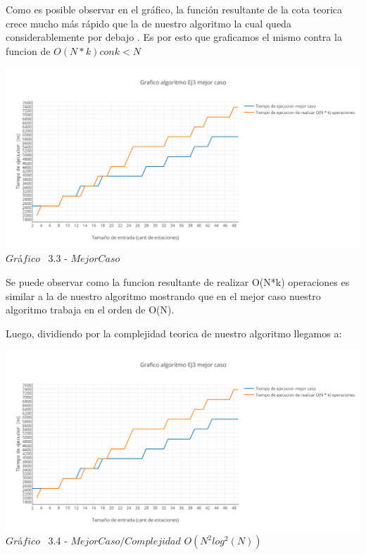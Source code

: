 Como es posible observar en el gr\'afico, la funci\'on resultante de la cota teorica crece mucho m\'as r\'apido que la de nuestro algoritmo la cual queda considerablemente por debajo . Es por esto que graficamos el mismo contra la funcion de $O(N*k) con k < N$

\vspace*{0.3cm} \vspace*{0.3cm}
  \begin{center}
 \includegraphics[scale=0.65]{./EJ3/mejorcaso1.png}
 {$Gr$\'a$fico$ \ 3.3 - $Mejor Caso$}
  \end{center}
  \vspace*{0.3cm}


Se puede observar como la funcion resultante de realizar O(N*k) operaciones es similar a la de nuestro algoritmo mostrando que en el mejor caso nuestro algoritmo trabaja en el orden de O(N).

Luego, dividiendo por la complejidad teorica de nuestro algoritmo llegamos a:\\

\vspace*{0.3cm} \vspace*{0.3cm}
  \begin{center}
\includegraphics[scale=0.65]{./EJ3/mejorcaso1.png}
{$Gr$\'a$fico$ \ 3.4 - $Mejor Caso / Complejidad$ $O(N^2 log^2(N))$}
  \end{center}
  \vspace*{0.3cm}


